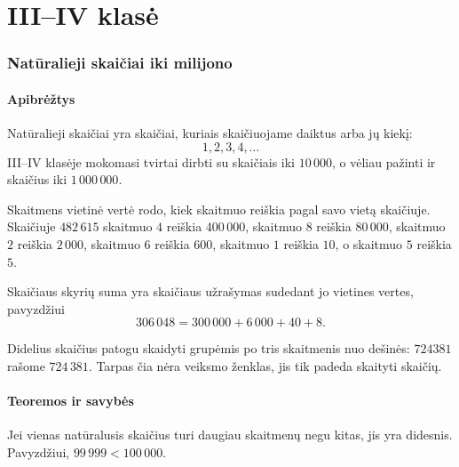 \part{III--IV klasė}

\section{Natūralieji skaičiai iki milijono}\label{sec:naturalieji-skaiciai-iki-milijono}

\subsection{Apibrėžtys}

\begin{apibreztis}
Natūralieji skaičiai yra skaičiai, kuriais skaičiuojame daiktus arba jų kiekį:
\[
1,2,3,4,\ldots
\]
III--IV klasėje mokomasi tvirtai dirbti su skaičiais iki \(10\,000\), o vėliau pažinti ir skaičius iki \(1\,000\,000\).
\end{apibreztis}

\begin{apibreztis}
Skaitmens vietinė vertė rodo, kiek skaitmuo reiškia pagal savo vietą skaičiuje. Skaičiuje \(482\,615\) skaitmuo \(4\) reiškia \(400\,000\), skaitmuo \(8\) reiškia \(80\,000\), skaitmuo \(2\) reiškia \(2\,000\), skaitmuo \(6\) reiškia \(600\), skaitmuo \(1\) reiškia \(10\), o skaitmuo \(5\) reiškia \(5\).
\end{apibreztis}

\begin{apibreztis}
Skaičiaus skyrių suma yra skaičiaus užrašymas sudedant jo vietines vertes, pavyzdžiui
\[
306\,048=300\,000+6\,000+40+8.
\]
\end{apibreztis}

\begin{pastaba}
Didelius skaičius patogu skaidyti grupėmis po tris skaitmenis nuo dešinės: \(724381\) rašome \(724\,381\). Tarpas čia nėra veiksmo ženklas, jis tik padeda skaityti skaičių.
\end{pastaba}

\subsection{Teoremos ir savybės}

\begin{savybe}
Jei vienas natūralusis skaičius turi daugiau skaitmenų negu kitas, jis yra didesnis. Pavyzdžiui, \(99\,999<100\,000\).
\end{savybe}

